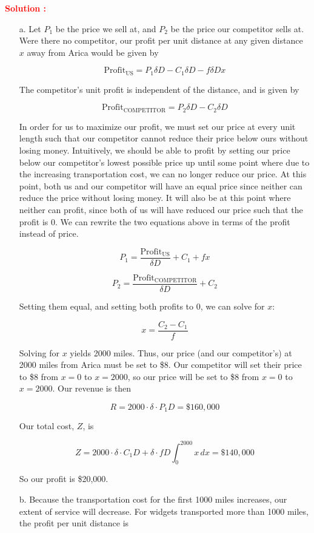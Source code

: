 \documentclass[12pt]{article}
\begin{document}
\textbf{\textcolor{red}{Solution :}} 
\begin{itemize}
    \item [a.] Let \(P_1\) be the price we sell at, and \(P_2\) be the price our competitor sells at. Were there no competitor, our profit per unit distance at any given distance \(x\) away from Arica would be given by

\[
\text{Profit}_{\text{US}} = P_1 \delta D - C_1 \delta D - f \delta D x
\]

The competitor’s unit profit is independent of the distance, and is given by

\[
\text{Profit}_{\text{COMPETITOR}} = P_2 \delta D - C_2 \delta D
\]

In order for us to maximize our profit, we must set our price at every unit length such that our competitor cannot reduce their price below ours without losing money. Intuitively, we should be able to profit by setting our price below our competitor's lowest possible price up until some point where due to the increasing transportation cost, we can no longer reduce our price. At this point, both us and our competitor will have an equal price since neither can reduce the price without losing money. It will also be at this point where neither can profit, since both of us will have reduced our price such that the profit is 0. We can rewrite the two equations above in terms of the profit instead of price.

\[
P_1 = \frac{\text{Profit}_{\text{US}}}{\delta D} + C_1 + fx
\]

\[
P_2 = \frac{\text{Profit}_{\text{COMPETITOR}}}{\delta D} + C_2
\]

Setting them equal, and setting both profits to 0, we can solve for \(x\):

\[
x = \frac{C_2 - C_1}{f}
\]

Solving for \(x\) yields 2000 miles. Thus, our price (and our competitor's) at 2000 miles from Arica must be set to \$8. Our competitor will set their price to \$8 from \(x = 0\) to \(x = 2000\), so our price will be set to \$8 from \(x = 0\) to \(x = 2000\). Our revenue is then

\[
R = 2000 \cdot \delta \cdot P_1 D = \$160{,}000
\]

Our total cost, \(Z\), is

\[
Z = 2000 \cdot \delta \cdot C_1 D + \delta \cdot f D \int_0^{2000} x \, dx= \$140{,}000
\]

So our profit is \$20{,}000.


    \item [b.] Because the transportation cost for the first 1000 miles increases, our extent of service will decrease. For widgets transported more than 1000 miles, the profit per unit distance is 


\end{itemize}
\end{document}
